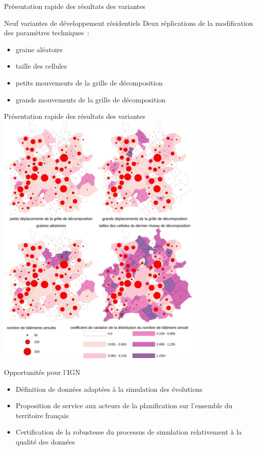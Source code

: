 \documentclass[xcolor=table]{beamer}
\newcommand\FontPetit{\fontsize{8}{6}\selectfont}
\begin{document}
\begin{frame}{Présentation rapide des résultats des variantes}
\begin{block}{Neuf variantes de développement résidentiels}
	\vspace{0.1cm}
	Deux réplications de la modification des paramètres techniques~:
	\begin{itemize}
		\item graine aléatoire
		\item taille des cellules
		\item petits mouvements de la grille de décomposition
		\item grands mouvements de la grille de décomposition
	\end{itemize}
\end{block}
\end{frame}

\begin{frame}{Présentation rapide des résultats des variantes}
	\includegraphics[width=10cm]{cartes/CVNbBat.png}
\end{frame}

\begin{frame}{Opportunités pour l'IGN}
\begin{itemize}
	\item Définition de données adaptées à la simulation des évolutions
	\item Proposition de service aux acteurs de la planification sur l'ensemble du territoire français
	\item Certification de la robustesse du processus de simulation relativement à la qualité des données
\end{itemize}
\end{frame}
\end{document}
